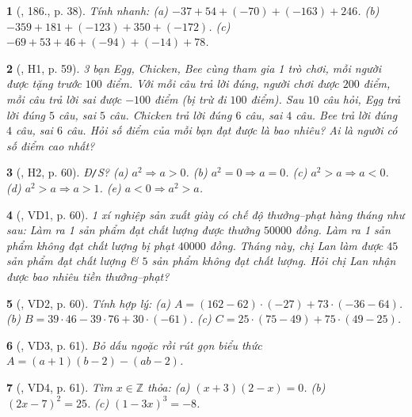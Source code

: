 \documentclass{article}
\newtheorem{baitoan}{}
\begin{document}
\begin{baitoan}[\cite{Tuyen_Toan_6}, 186., p. 38]
	Tính nhanh: (a) $-37 + 54 + (-70) + (-163) + 246$. (b) $-359 + 181 + (-123) + 350 + (-172)$. (c) $-69 + 53 + 46 + (-94) + (-14) + 78$.
\end{baitoan}

\begin{baitoan}[\cite{Binh_boi_duong_Toan_6_tap_1}, H1, p. 59]
	3 bạn Egg, Chicken, Bee cùng tham gia 1 trò chơi, mỗi người được tặng trước $100$ điểm. Với mỗi câu trả lời đúng, người chơi được $200$ điểm, mỗi câu trả lời sai được $-100$ điểm (bị trừ đi $100$ điểm). Sau $10$ câu hỏi, Egg trả lời đúng $5$ câu, sai $5$ câu. Chicken trả lời đúng $6$ câu, sai $4$ câu. Bee trả lời đúng $4$ câu, sai $6$ câu. Hỏi số điểm của mỗi bạn đạt được là bao nhiêu? Ai là người có số điểm cao nhất?
\end{baitoan}

\begin{baitoan}[\cite{Binh_boi_duong_Toan_6_tap_1}, H2, p. 60]
	{\rm Đ{\tt/}S?} (a) $a^2\Rightarrow a > 0$. (b) $a^2 = 0\Rightarrow a = 0$. (c) $a^2 > a\Rightarrow a < 0$. (d) $a^2 > a\Rightarrow a > 1$. (e) $a < 0\Rightarrow a^2 > a$.
\end{baitoan}

\begin{baitoan}[\cite{Binh_boi_duong_Toan_6_tap_1}, VD1, p. 60]
	1 xí nghiệp sản xuất giày có chế độ thưởng--phạt hàng tháng như sau: Làm ra 1 sản phẩm đạt chất lượng được thưởng $50000$ đồng. Làm ra 1 sản phẩm không đạt chất lượng bị phạt $40000$ đồng. Tháng này, chị Lan làm được $45$ sản phẩm đạt chất lượng \& $5$ sản phẩm không đạt chất lượng. Hỏi chị Lan nhận được bao nhiêu tiền thưởng--phạt?
\end{baitoan}

\begin{baitoan}[\cite{Binh_boi_duong_Toan_6_tap_1}, VD2, p. 60]
	Tính hợp lý: (a) $A = (162 - 62)\cdot(-27) + 73\cdot(-36 - 64)$. (b) $B = 39\cdot46 - 39\cdot76 + 30\cdot(-61)$. (c) $C = 25\cdot(75 - 49) + 75\cdot(49 - 25)$.
\end{baitoan}

\begin{baitoan}[\cite{Binh_boi_duong_Toan_6_tap_1}, VD3, p. 61]
	Bỏ dấu ngoặc rồi rút gọn biểu thức $A = (a + 1)(b - 2) - (ab - 2)$.
\end{baitoan}

\begin{baitoan}[\cite{Binh_boi_duong_Toan_6_tap_1}, VD4, p. 61]
	Tìm $x\in\mathbb{Z}$ thỏa: (a) $(x + 3)(2 - x) = 0$. (b) $(2x - 7)^2 = 25$. (c) $(1 - 3x)^3 = -8$.
\end{baitoan}
\end{document}
